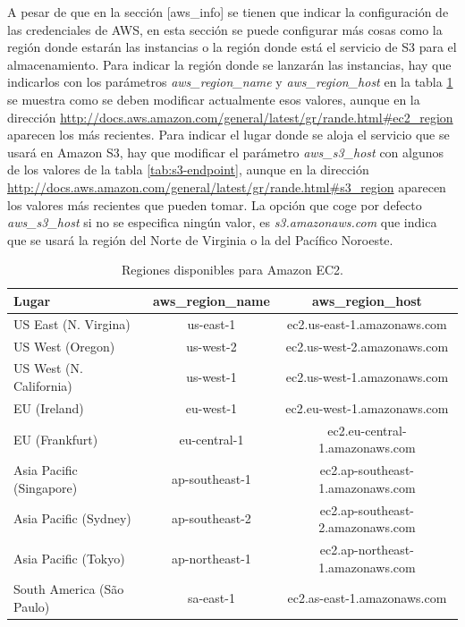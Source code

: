 \documentclass{article}
\begin{document}
	A pesar de que en la sección [aws\_info] se tienen que indicar la configuración de las credenciales de AWS, en esta sección se puede configurar más cosas como la región donde estarán las instancias o la región donde está el servicio de S3 para el almacenamiento. Para indicar la región donde se lanzarán las instancias, hay que indicarlos con los parámetros \emph{aws\_region\_name} y \emph{aws\_region\_host} en la tabla \ref{tab:ec2-endpoint} se muestra como se deben modificar actualmente esos valores, aunque en la dirección \url{http://docs.aws.amazon.com/general/latest/gr/rande.html#ec2_region} aparecen los más recientes. Para indicar el lugar donde se aloja el servicio que se usará en Amazon S3, hay que modificar el parámetro \emph{aws\_s3\_host} con algunos de los valores de la tabla \ref{tab:s3-endpoint}, aunque en la dirección \url{http://docs.aws.amazon.com/general/latest/gr/rande.html#s3_region} aparecen los valores más recientes que pueden tomar. La opción que coge por defecto \emph{aws\_s3\_host} si no se especifica ningún valor, es \emph{s3.amazonaws.com} que indica que se usará la región del Norte de Virginia o la del Pacífico Noroeste.

\begin{table}[h]
	\begin{center}
		\caption{Regiones disponibles para Amazon EC2.}
		\begin{tabular}{|l|c|c|}
\hline
\textbf{Lugar} &
\textbf{aws\_region\_name} &
\textbf{aws\_region\_host} \\ \hline
\hline
US East (N. Virgina)          & us-east-1          &  ec2.us-east-1.amazonaws.com \\ \hline
US West (Oregon)             & us-west-2         &  ec2.us-west-2.amazonaws.com \\ \hline
US West (N. California)      & us-west-1         &  ec2.us-west-1.amazonaws.com \\ \hline
EU (Ireland)                       & eu-west-1         &  ec2.eu-west-1.amazonaws.com \\ \hline
EU (Frankfurt)                   & eu-central-1      & ec2.eu-central-1.amazonaws.com \\ \hline
Asia Pacific (Singapore)     & ap-southeast-1 & ec2.ap-southeast-1.amazonaws.com \\ \hline
Asia Pacific (Sydney)         & ap-southeast-2 & ec2.ap-southeast-2.amazonaws.com \\ \hline
Asia Pacific (Tokyo)            & ap-northeast-1 & ec2.ap-northeast-1.amazonaws.com \\ \hline
South America (São Paulo) & sa-east-1         & ec2.as-east-1.amazonaws.com \\ \hline
		\end{tabular}
		\label{tab:ec2-endpoint}
	\end{center}
\end{table}
\end{document}
